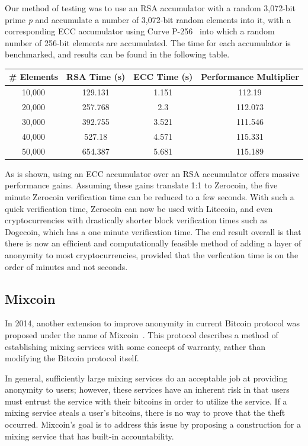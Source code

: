 \documentclass[11pt]{article}
\begin{document}
Our method of testing was to use an RSA accumulator with a random 3,072-bit prime \emph{p} and accumulate a number of
3,072-bit random elements into it, with a corresponding ECC accumulator using Curve P-256~\cite{curves} into which a
random number of 256-bit elements are accumulated. The time for each accumulator is benchmarked, and results can be
found in the following table.
\begin{center}
\begin{tabular}{|c|c|c|c|}
    \hline
    \textbf{\# Elements} & \textbf{RSA Time (s)} & \textbf{ECC Time (s)} & \textbf{Performance Multiplier} \\
    \hline
    10,000 & 129.131 & 1.151 & 112.19 \\
    \hline
    20,000 & 257.768 & 2.3 & 112.073 \\
    \hline
    30,000 & 392.755 & 3.521 & 111.546 \\
    \hline
    40,000 & 527.18 & 4.571 & 115.331 \\
    \hline
    50,000 & 654.387 & 5.681 & 115.189 \\
    \hline
\end{tabular}
\end{center}

As is shown, using an ECC accumulator over an RSA accumulator offers massive performance gains. Assuming these gains
translate 1:1 to Zerocoin, the five minute Zerocoin verification time can be reduced to a few seconds. With such a quick
verification time, Zerocoin can now be used with Litecoin, and even cryptocurrencies with drastically shorter block
verification times such as Dogecoin, which has a one minute verification time. The end result overall is that there is
now an efficient and computationally feasible method of adding a layer of anonymity to most cryptocurrencies, provided
that the verfication time is on the order of minutes and not seconds.

\subsection{Mixcoin}
In 2014, another extension to improve anonymity in current Bitcoin protocol was proposed under the name of
Mixcoin~\cite{bonneau14}. This protocol describes a method of establishing mixing services with some concept of
warranty, rather than modifying the Bitcoin protocol itself.

In general, sufficiently large mixing services do an acceptable job at providing anonymity to users; however, these
services have an inherent risk in that users must entrust the service with their bitcoins in order to utilize the
service.  If a mixing service steals a user's bitcoins, there is no way to prove that the theft occurred. Mixcoin's goal
is to address this issue by proposing a construction for a mixing service that has built-in accountability.
\end{document}

